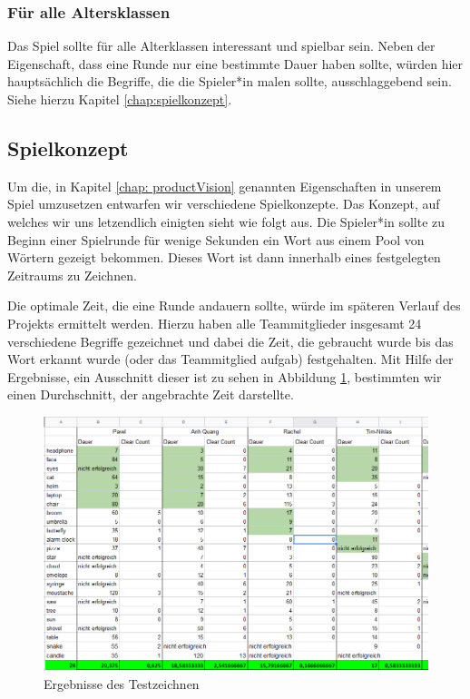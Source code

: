 \documentclass[11pt]{article}
\begin{document}
\subsubsection{Für alle Altersklassen}
Das Spiel sollte für alle Alterklassen interessant und spielbar sein. Neben der Eigenschaft, dass eine Runde nur eine bestimmte Dauer haben sollte, würden hier hauptsächlich die Begriffe, die die Spieler*in malen sollte, ausschlaggebend sein. Siehe hierzu Kapitel \ref{chap:spielkonzept}.
\subsection{Spielkonzept}
Um die, in Kapitel \ref{chap: productVision} genannten Eigenschaften in unserem Spiel umzusetzen entwarfen wir verschiedene Spielkonzepte. Das Konzept, auf welches wir uns letzendlich einigten sieht wie folgt aus.
Die Spieler*in sollte zu Beginn einer Spielrunde für wenige Sekunden ein Wort aus einem Pool von Wörtern gezeigt bekommen. Dieses Wort ist dann innerhalb eines festgelegten Zeitraums zu Zeichnen.

Die optimale Zeit, die eine Runde andauern sollte, würde im späteren Verlauf des Projekts ermittelt werden. Hierzu haben alle Teammitglieder insgesamt 24 verschiedene Begriffe gezeichnet und dabei die Zeit, die gebraucht wurde bis das Wort erkannt wurde (oder das Teammitglied aufgab) festgehalten. Mit Hilfe der Ergebnisse, ein Ausschnitt dieser ist zu sehen in Abbildung \ref{fig:testResults}, bestimmten wir einen Durchschnitt, der angebrachte Zeit darstellte. 

\label{chap:spielkonzept}
\begin{figure}[ht]
\centering
\includegraphics[width=1\textwidth]{images/blindtesting.png}
\caption{\label{fig:testResults}Ergebnisse des Testzeichnen}
\end{figure}
\end{document}
